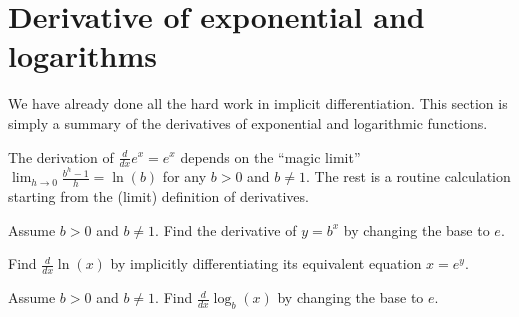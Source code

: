 \documentclass[../main.tex]{subfiles}
\begin{document}
 \section{Derivative of exponential and logarithms}
We have already done all the hard work in implicit differentiation.  This section is simply a summary of the derivatives of exponential and logarithmic functions. 

The derivation of \(\frac{d}{dx} e^{x} = e^{x}\) depends on the ``magic limit'' \(\lim_{h \to 0} \frac{b^{h} - 1}{h} = \ln(b)\) for any \(b > 0\) and \(b \ne 1\). The rest is a routine calculation starting from the (limit) definition of derivatives. 

\begin{example}
  Assume \(b > 0\) and \(b \ne 1\). Find the derivative of \(y = b^{x}\) by changing the base to \(e\).

\end{example}

\begin{example}
  Find \(\frac{d}{dx}\ln(x)\) by implicitly differentiating its equivalent equation \(x = e^{y}\).

\end{example}

\begin{example}
  Assume \(b > 0\) and \(b \ne 1\). Find \(\frac{d}{dx} \log_{b}(x)\) by changing the base to \(e\).

\end{example}
\end{document}
